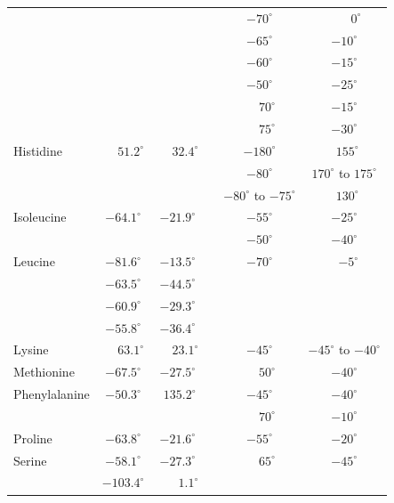 \documentclass[12pt]{article}
\begin{document}
\begin{center}
\begin{tabular}{lccccc}
                 &      &       & & $-70^{\circ}$ & ~\,$\phantom{-}0^{\circ}$\\
                 &      &       & & $-65^{\circ}$ & $-10^{\circ}$\\
                 &      &       & & $-60^{\circ}$ & $-15^{\circ}$\\
                 &      &       & & $-50^{\circ}$ & $-25^{\circ}$\\
                 &      &       & & $\phantom{-}70^{\circ}$ & $-15^{\circ}$\\
                 &      &       & & $\phantom{-}75^{\circ}$ & $-30^{\circ}$\\
Histidine        & $\phantom{-}51.2^{\circ}$ & $\phantom{-}32.4^{\circ}$ & & $-180^{\circ}$ & ~$155^{\circ}$  \\
		 &	 &	& & $-80^{\circ}$ & $170^{\circ}$ to $175^{\circ}$ \\
                 &       &      & & $-80^{\circ}$ to $-75^{\circ}$ & ~$130^{\circ}$ \\
Isoleucine      & $-64.1^{\circ}$ & $-21.9^{\circ}$ & & $-55^{\circ}$ & $-25^{\circ}$ \\
		&	&	& & $-50^{\circ}$ & $-40^{\circ}$ \\
Leucine         & $-81.6^{\circ}$ & $-13.5^{\circ}$ & & $-70^{\circ}$ &  ~\,$-5^{\circ}$  \\
                & $-63.5^{\circ}$ & $-44.5^{\circ}$ & & & \\
                & $-60.9^{\circ}$ & $-29.3^{\circ}$ & & & \\
                & $-55.8^{\circ}$ & $-36.4^{\circ}$ & & & \\     
Lysine          & $\phantom{-}63.1^{\circ}$ & $\phantom{-}23.1^{\circ}$ & & $-45^{\circ}$ & $-45^{\circ}$ to $-40^{\circ}$ \\
Methionine      & $-67.5^{\circ}$ & $-27.5^{\circ}$ & & $\phantom{-}50^{\circ}$ & $-40^{\circ}$  \\
Phenylalanine   & $-50.3^{\circ}$ & \,\,$135.2^{\circ}$ & & $-45^{\circ}$ & $-40^{\circ}$  \\
                &       &       & & $\phantom{-}70^{\circ}$ & $-10^{\circ}$ \\
Proline         &  $-63.8^{\circ}$ & $-21.6^{\circ}$ & & $-55^{\circ}$ & $-20^{\circ}$  \\
Serine          & $-58.1^{\circ}$ & $-27.3^{\circ}$ & & $\phantom{-}65^{\circ}$ & $-45^{\circ}$ \\
		& $-103.4^{\circ}$ & $\phantom{-}\phantom{0}1.1^{\circ}$ & & & \\

\end{tabular}
\end{center}
\end{document}
